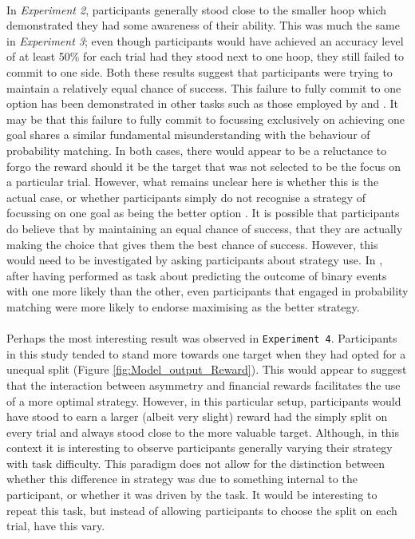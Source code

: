 \documentclass[12pt]{article}
\begin{document}
\paragraph{} In \textit{Experiment 2}, participants generally stood close to the smaller hoop which demonstrated they had some awareness of their ability. This was much the same in \textit{Experiment 3}; even though participants would have achieved an accuracy level of at least 50\% for each trial had they stood next to one hoop, they still failed to commit to one side. Both these results suggest that participants were trying to maintain a relatively equal chance of success. This failure to fully commit to one option has been demonstrated in other tasks such as those employed by \cite{CHAPMAN2010168} and \cite{Hudson2007probmove}. It may be that this failure to fully commit to focussing exclusively on achieving one goal shares a similar fundamental misunderstanding with the behaviour of probability matching. In both cases, there would appear to be a reluctance to forgo the reward should it be the target that was not selected to be the focus on a particular trial. However, what remains unclear here is whether this is the actual case, or whether participants simply do not recognise a strategy of focussing on one goal as being the better option \citep{kahneman1982judgement}. It is possible that participants do believe that by maintaining an equal chance of success, that they are actually making the choice that gives them the best chance of success. However, this would need to be investigated by asking participants about strategy use. In \cite{Koehler2010}, after having performed as task about predicting the outcome of binary events with one more likely than the other, even participants that engaged in probability matching were more likely to endorse maximising as the better strategy. 

\paragraph{} Perhaps the most interesting result was observed in \texttt{Experiment 4}. Participants in this study tended to stand more towards one target when they had opted for a unequal split (Figure \ref{fig:Model_output_Reward}). This would appear to suggest that the interaction between asymmetry and financial rewards facilitates the use of a more optimal strategy. However, in this particular setup, participants would have stood to earn a larger (albeit very slight) reward had the simply split on every trial and always stood close to the more valuable target. Although, in this context it is interesting to observe participants generally varying their strategy with task difficulty. This paradigm does not allow for the distinction between whether this difference in strategy was due to something internal to the participant, or whether it was driven by the task. It would be interesting to repeat this task, but instead of allowing participants to choose the split on each trial, have this vary. 
\end{document}
